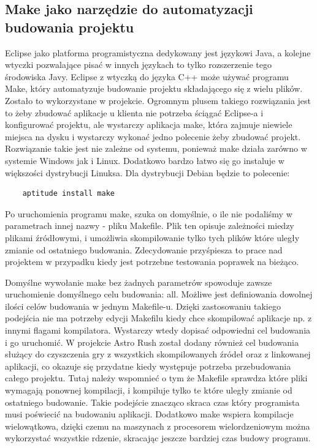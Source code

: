 \subsection{Make jako narzędzie do automatyzacji budowania projektu}
\hspace{1cm} Eclipse jako platforma programistyczna dedykowany jest językowi Java, a kolejne wtyczki pozwalające pisać w innych językach to tylko rozszerzenie tego środowiska Javy. Eclipse z wtyczką do języka C++ może używać programu Make, który automatyzuje budowanie projektu składającego się z wielu plików. Zostało to wykorzystane w projekcie. Ogromnym plusem takiego rozwiązania jest to żeby zbudować aplikacje u klienta nie potrzeba ściągać Eclipse-a i konfigurować projektu, ale wystarczy aplikacja make, która zajmuje niewiele miejsca na dysku i  wystarczy wykonać jedno polecenie żeby zbudować projekt. Rozwiązanie takie jest nie zależne od systemu, ponieważ make działa zarówno w systemie Windows jak i Linux. Dodatkowo bardzo łatwo się go instaluje w większości dystrybucji Linuksa. Dla dystrybucji Debian będzie to polecenie:

\begin{center}
\begin{verbatim}
	aptitude install make
\end{verbatim}
\end{center}

Po uruchomienia programu make, szuka on domyślnie, o ile nie podaliśmy w parametrach innej nazwy - pliku Makefile. Plik ten opisuje zależności miedzy plikami źródłowymi, i umożliwia skompilowanie tylko tych plików które uległy zmianie od ostatniego budowania. Zdecydowanie przyśpiesza to prace nad projektem w przypadku kiedy jest potrzebne testowania poprawek na bieżąco. 

Domyślne wywołanie make bez żadnych parametrów spowoduje zawsze uruchomienie domyślnego celu budowania: all. Możliwe jest definiowania dowolnej ilości celów budowania w jednym Makefile-u. Dzięki zastosowaniu takiego podejścia nie ma potrzeby edycji Makefilu kiedy chce skompilować aplikacje np. z innymi flagami kompilatora. Wystarczy wtedy dopisać odpowiedni cel budowania i go uruchomić. W projekcie Astro Rush został dodany również cel budowania służący do czyszczenia gry z wszystkich skompilowanych źródeł oraz z linkowanej aplikacji, co okazuje się przydatne kiedy występuje potrzeba przebudowania całego projektu. Tutaj należy wspomnieć o tym że Makefile sprawdza które pliki wymagają ponownej kompilacji, i kompiluje tylko te które uległy zmianie od ostatniego budowanie. Takie podejście znacząco skraca czas który programista musi poświecić na budowaniu aplikacji. Dodatkowo make wspiera kompilacje wielowątkowa, dzięki czemu na maszynach z procesorem wielordzeniowym można wykorzystać wszystkie rdzenie, skracając jeszcze bardziej czas budowy programu. 

